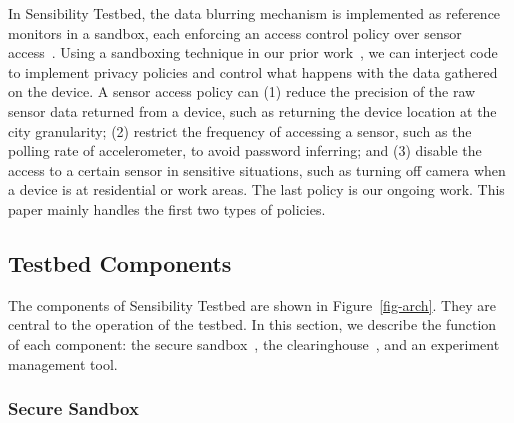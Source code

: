 In Sensibility Testbed, the data blurring 
mechanism is implemented as reference monitors in a sandbox, 
each enforcing an access control 
policy over sensor access~\cite{ref}. Using a sandboxing 
technique in our prior work~\cite{cappos2010retaining}, we can 
interject code to implement privacy policies and control what 
happens with the data gathered on the device. A sensor access 
policy can (1) reduce 
the precision of the raw sensor data returned from a device, such
as returning the device location at the city granularity; (2) restrict 
the frequency of accessing a sensor, such as the polling rate of 
accelerometer, to avoid password inferring; and (3) disable the 
access to a certain sensor in sensitive situations, such as 
turning off camera when a device is at residential or work areas.
The last policy is our ongoing work. This paper mainly handles
the first two types of policies. 

\subsection{Testbed Components}\label{sec-component}

The components of Sensibility Testbed are shown in Figure~\ref{fig-arch}.
They are central to the operation of the testbed. 
In this section, we describe the function of each component: the
secure sandbox~\cite{cappos2010retaining}, the clearinghouse~\cite{ch}, 
and an experiment management tool.

\subsubsection{Secure Sandbox}\label{sec-repy}

